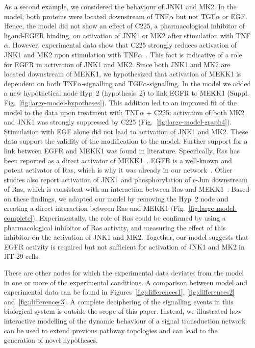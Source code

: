 As a second example, we considered the behaviour of JNK1 and MK2. In the model, both
proteins were located downstream of TNF$\alpha$ but not TGF$\alpha$ or EGF. Hence, the
model did not show an effect of C225, a pharmacological inhibitor of ligand-EGFR
binding, on activation of JNK1 or MK2 after stimulation with TNF$\alpha$. However, experimental
data show that C225 strongly reduces activation of JNK1 and MK2 upon stimulation with
TNF$\alpha$~\citep{pathway-autocrine}.
This fact is indicative of a role for EGFR in activation of JNK1 and MK2. Since both JNK1 and MK2
are located downstream of MEKK1, we hypothesized that activation
of MEKK1 is dependent on
both TNF$\alpha$-signalling and TGF$\alpha$-signalling. In the model we added a new
hypothetical node {\sf Hyp~2} (hypothesis~2) to link EGFR to MEKK1 (Suppl. Fig.~\ref{fig:large-model-hypotheses}).
This addition led to an improved fit of the model to the data upon treatment with TNF$\alpha$ + C225:
activation of both MK2 and JNK1 was strongly suppressed by C225 (Fig.~\ref{fig:large-model-graph4}).
Stimulation with EGF alone did not lead to activation of JNK1 and MK2.
These data support the validity of the modification to the model.
Further support for a link between EGFR and MEKK1 was found in literature. Specifically,
Ras has been reported as a direct activator of
MEKK1~\citep{ras-mekk1}. EGFR is a well-known and potent activator of Ras,
which is why it was already in our network~\citep{kegg}.
Other studies also report activation of JNK1 and phosphorylation of c-Jun downstream of Ras, which is consistent with
an interaction between Ras and MEKK1~\citep{cfos-cjun,ras-jnk1}.
Based on these findings, we adapted
our model by removing the {\sf Hyp~2} node and creating a direct interaction between Ras
and MEKK1 (Fig.~\ref{fig:large-model-complete}). Experimentally, the role of Ras could be confirmed by using a
pharmacological inhibitor of Ras activity, and measuring the effect of this inhibitor on the activation of JNK1 and MK2.
Together, our model suggests that EGFR activity is required
but not sufficient for activation of JNK1 and MK2 in HT-29 cells.


There are other nodes for which the experimental data deviates from the model in one or more of the experimental conditions.
A comparison between model and experimental data can be found in Figures~\ref{fig:differences1}, \ref{fig:differences2} and~\ref{fig:differences3}.
A complete deciphering of the signalling events
in this biological system is outside the scope of this paper. Instead, we illustrated how interactive modelling of the dynamic behaviour
of a signal transduction network can be used to extend previous pathway topologies and can lead to the generation of novel hypotheses.
